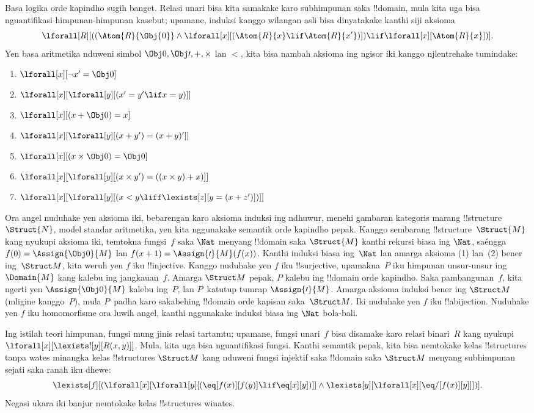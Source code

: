 \documentclass[../../../include/open-logic-section]{subfiles}
\begin{document}
Basa logika orde kapindho
sugih banget. Relasi unari
bisa kita samakake karo
subhimpunan saka !!{domain},
mula kita uga bisa
nguantifikasi himpunan-himpunan
kasebut; upamane, induksi
kanggo wilangan asli bisa
dinyatakake kanthi siji aksioma
\[
\lforall[R][((\Atom{R}{\Obj{0}} \land \lforall[x][(\Atom{R}{x} \lif
    \Atom{R}{x'})]) \lif \lforall[x][\Atom{R}{x}])].
\]
Yen basa aritmetika nduweni
simbol $\Obj 0, \Obj \prime, +,
\times$ lan $<$, kita bisa
nambah aksioma ing ngisor iki
kanggo njlentrehake tumindake:
\begin{enumerate}
\item $\lforall[x][\lnot x' = \Obj 0]$
\item $\lforall[x][\lforall[y][(x' = y' \lif x = y)]]$
\item $\lforall[x][(x + \Obj 0) = x]$
\item $\lforall[x][\lforall[y][(x + y') = (x + y)']]$
\item $\lforall[x][(x \times \Obj 0) = \Obj 0]$
\item $\lforall[x][\lforall[y][(x \times y') = ((x \times y) + x)]]$
\item $\lforall[x][\lforall[y][(x < y \liff \lexists[z][y = (x + z')])]]$
\end{enumerate}
Ora angel nuduhake yen aksioma
iki, bebarengan karo aksioma
induksi ing ndhuwur, menehi
gambaran kategoris marang
!!{structure}~$\Struct{N}$,
model standar aritmetika,
yen kita nggunakake semantik
orde kapindho pepak.
Kanggo sembarang
!!{structure}~$\Struct{M}$
kang nyukupi aksioma iki,
temtokna fungsi~$f$
saka $\Nat$ menyang
!!{domain} saka $\Struct{M}$
kanthi rekursi biasa ing $\Nat$,
saéngga $f(0) = \Assign{\Obj 0}{M}$
lan $f(x+1) = \Assign{\prime}{M}(f(x))$.
Kanthi induksi biasa
ing~$\Nat$ lan amarga aksioma
(1) lan~(2) bener ing~$\Struct M$,
kita weruh yen $f$ iku
!!{injective}. Kanggo nuduhake
yen $f$ iku !!{surjective},
upamakna~$P$ iku himpunan
unsur-unsur ing~$\Domain{M}$
kang kalebu ing jangkauan~$f$.
Amarga $\Struct M$ pepak,
$P$ kalebu ing !!{domain}
orde kapindho. Saka pambangunan~$f$,
kita ngerti yen $\Assign{\Obj
  0}{M}$ kalebu ing~$P$,
lan $P$~katutup tumrap
$\Assign{\prime}{M}$.
Amarga aksioma induksi bener
ing $\Struct M$ (mligine
kanggo~$P$), mula $P$~padha
karo sakabehing !!{domain}
orde kapisan saka~$\Struct M$.
Iki nuduhake yen $f$
iku !!a{bijection}.
Nuduhake yen $f$ iku
homomorfisme ora luwih angel,
kanthi nggunakake induksi
biasa ing $\Nat$ bola-bali.

Ing istilah teori himpunan,
fungsi mung jinis relasi
tartamtu; upamane, fungsi
unari~$f$ bisa disamake
karo relasi binari~$R$
kang nyukupi
$\lforall[x][\lexists![y][R(x,y)]]$.
Mula, kita uga bisa
nguantifikasi fungsi.
Kanthi semantik pepak,
kita bisa nemtokake kelas
!!{structure}s tanpa wates
minangka kelas
!!{structure}s $\Struct M$
kang nduweni fungsi injektif
saka !!{domain} saka $\Struct M$
menyang subhimpunan sejati
saka ranah iku dhewe:
\[
\lexists[f][(\lforall[x][\lforall[y][(\eq[f(x)][f(y)] \lif \eq[x][y])]]
  \land \lexists[y][\lforall[x][\eq/[f(x)][y]]])].
\]
Negasi ukara iki banjur
nemtokake kelas
!!{structure}s winates.
\end{document}
